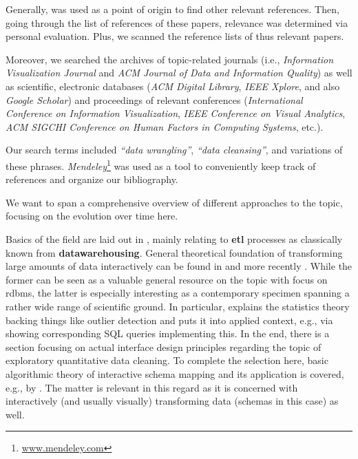 Generally, \cite{Kandel2011a} was used as a point of origin to find other relevant references.
Then, going through the list of references of these papers, relevance was determined via personal evaluation.
Plus, we scanned the reference lists of thus relevant papers.

Moreover, we searched the archives of topic-related journals (i.e., \emph{Information Visualization Journal} and \emph{ACM Journal of Data and Information Quality}) as well as scientific, electronic databases (\emph{ACM Digital Library}, \emph{IEEE Xplore}, and also \emph{Google Scholar}) and proceedings of relevant conferences (\emph{International Conference on Information Visualization}, \emph{IEEE Conference on Visual Analytics}, \emph{ACM SIGCHI Conference on Human Factors in Computing Systems}, etc.).

Our search terms included \emph{``data wrangling''}, \emph{``data cleansing''}, and variations of these phrases.
\emph{Mendeley}\footnote{\textcolor{blue}{\href{https://www.mendeley.com/}{www.mendeley.com}}} was used as a tool to conveniently keep track of references and organize our bibliography.

We want to span a comprehensive overview of different approaches to the topic, focusing on the evolution over time here.

Basics of the field are laid out in \cite{Dasu2003}, mainly relating to \textbf{\gls{etl}} processes as classically known from \textbf{\gls{datawarehousing}}.
General theoretical foundation of transforming large amounts of data interactively can be found in \cite{Dasu2002} and more recently \cite{Hellerstein2008}.
While the former can be seen as a valuable general resource on the topic with focus on \gls{rdbms}, the latter is especially interesting as a contemporary specimen spanning a rather wide range of scientific ground.
In particular, \cite{Hellerstein2008} explains the statistics theory backing things like outlier detection and puts it into applied context, e.g., via showing corresponding \textsc{SQL} queries implementing this.
In the end, there is a section focusing on actual interface design principles regarding the topic of exploratory quantitative data cleaning.
To complete the selection here, basic algorithmic theory of interactive schema mapping and its application is covered, e.g., by \cite{Chiticariu2008}.
The matter is relevant in this regard as it is concerned with interactively (and usually visually) transforming data (schemas in this case) as well.

